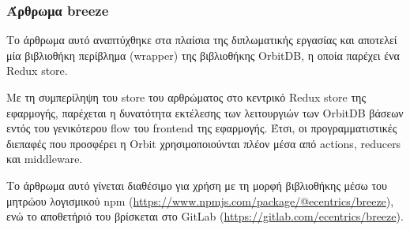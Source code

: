 \subsubsection{Άρθρωμα breeze} \label{subsubsection:4-3-1-eth-breeze-unit}

Το άρθρωμα αυτό αναπτύχθηκε στα πλαίσια της διπλωματικής εργασίας και αποτελεί μία βιβλιοθήκη περίβλημα (wrapper) της βιβλιοθήκης OrbitDB, η οποία παρέχει ένα Redux store. 

Με τη συμπερίληψη του store του αρθρώματος στο κεντρικό Redux store της εφαρμογής, παρέχεται η δυνατότητα εκτέλεσης των λειτουργιών των OrbitDB βάσεων εντός του γενικότερου flow του frontend της εφαρμογής. Έτσι, οι προγραμματιστικές διεπαφές που προσφέρει η Orbit χρησιμοποιούνται πλέον μέσα από actions, reducers και middleware.

Το άρθρωμα αυτό γίνεται διαθέσιμο για χρήση με τη μορφή βιβλιοθήκης μέσω του μητρώου λογισμικού npm (\url{https://www.npmjs.com/package/@ecentrics/breeze}), ενώ το αποθετήριό του βρίσκεται στο GitLab (\url{https://gitlab.com/ecentrics/breeze}).

